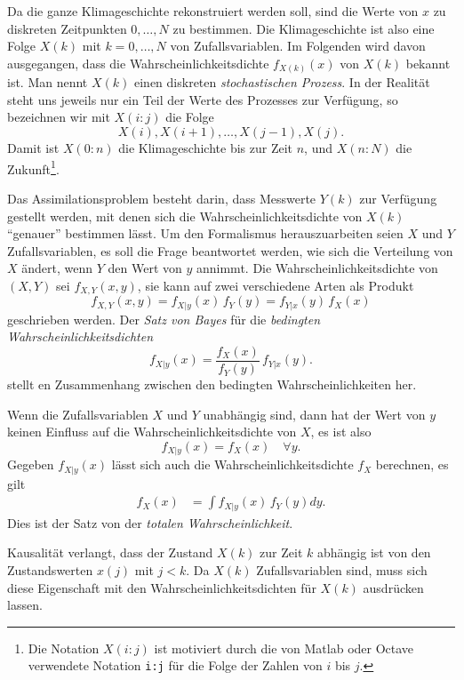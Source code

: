 Da die ganze Klimageschichte rekonstruiert werden soll, sind die Werte von
$x$ zu diskreten Zeitpunkten $0,\dots,N$ zu bestimmen.
Die Klimageschichte ist also eine Folge $X(k)$ mit $k=0,\dots,N$ von
Zufallsvariablen.
Im Folgenden wird davon ausgegangen, dass die Wahrscheinlichkeitsdichte
$f_{X(k)}(x)$ von $X(k)$ bekannt ist.
Man nennt $X(k)$ einen diskreten {\em stochastischen Prozess}.
%
%
In der Realität steht uns jeweils nur ein Teil der Werte des Prozesses zur
Verfügung, so bezeichnen wir mit $X(i:j)$ die Folge
\[
X(i),X(i+1),\dots,X(j-1),X(j).
\]
Damit ist $X(0:n)$ die Klimageschichte bis zur Zeit $n$, und $X(n:N)$ die
Zukunft\footnote{Die Notation $X(i:j)$ ist motiviert durch die 
von Matlab oder Octave verwendete Notation \texttt{i:j} für die
Folge der Zahlen von $i$ bis $j$.}.

Das Assimilationsproblem besteht darin, dass Messwerte $Y(k)$ zur Verfügung
gestellt werden, mit denen sich die Wahrscheinlichkeitsdichte von $X(k)$
``genauer'' bestimmen lässt.
Um den Formalismus herauszuarbeiten seien $X$ und $Y$ Zufallsvariablen,
es soll die Frage beantwortet werden, wie sich die Verteilung von $X$
ändert, wenn $Y$ den Wert von $y$  annimmt.
Die Wahrscheinlichkeitsdichte von $(X,Y)$ sei $f_{X,Y}(x,y)$, sie kann
auf zwei verschiedene Arten als Produkt
\begin{equation}
f_{X,Y}(x,y)
= 
f_{X|y}(x)\,f_Y(y)
=
f_{Y|x}(y)\,f_X(x)
\label{skript:bedpdf}
\end{equation}
geschrieben werden.
%
Der {\em Satz von Bayes} für die {\em bedingten Wahrscheinlichkeitsdichten}
\begin{equation}
f_{X|y}(x)
=
\frac{f_X(x)}{f_Y(y)}\,f_{Y|x}(y).
\label{assim:bayes}
\end{equation}
stellt en Zusammenhang zwischen den bedingten Wahrscheinlichkeiten her.

Wenn die Zufallsvariablen $X$ und $Y$ unabhängig sind, dann hat der
Wert von $y$ keinen Einfluss auf die Wahrscheinlichkeitsdichte von $X$,
es ist also
\[
f_{X|y}(x)
=
f_X(x)\quad\forall y.
\]
Gegeben $f_{X|y}(x)$ lässt sich auch die Wahrscheinlichkeitsdichte
$f_X$ berechnen, es gilt
\begin{align}
f_X(x)
&=
\int f_{X|y}(x)\,f_Y(y) dy.
\label{assim:total}
\end{align}
Dies ist der Satz von der {\em totalen Wahrscheinlichkeit}.
%

Kausalität verlangt, dass der Zustand $X(k)$ zur Zeit $k$ abhängig ist
von den Zustandswerten $x(j)$ mit $j<k$.
Da $X(k)$ Zufallsvariablen sind, muss sich diese Eigenschaft mit den
Wahrscheinlichkeitsdichten für $X(k)$ ausdrücken lassen.

